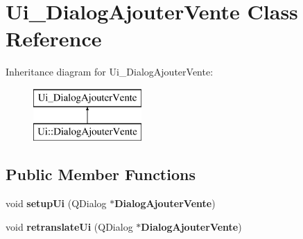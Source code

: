 \section{Ui\-\_\-\-Dialog\-Ajouter\-Vente Class Reference}
\label{class_ui___dialog_ajouter_vente}
Inheritance diagram for Ui\-\_\-\-Dialog\-Ajouter\-Vente\-:\begin{figure}[H]
\begin{center}
\leavevmode
\includegraphics[height=2.000000cm]{class_ui___dialog_ajouter_vente}
\end{center}
\end{figure}
\subsection*{Public Member Functions}
\begin{DoxyCompactItemize}
\item 
void {\bfseries setup\-Ui} (Q\-Dialog $\ast${\bf Dialog\-Ajouter\-Vente})\label{class_ui___dialog_ajouter_vente_ae883744c3e96eb7e48d7412542236d0b}

\item 
void {\bfseries retranslate\-Ui} (Q\-Dialog $\ast${\bf Dialog\-Ajouter\-Vente})\label{class_ui___dialog_ajouter_vente_ae2c336056d9da493f614411459dc933f}

\end{DoxyCompactItemize}
